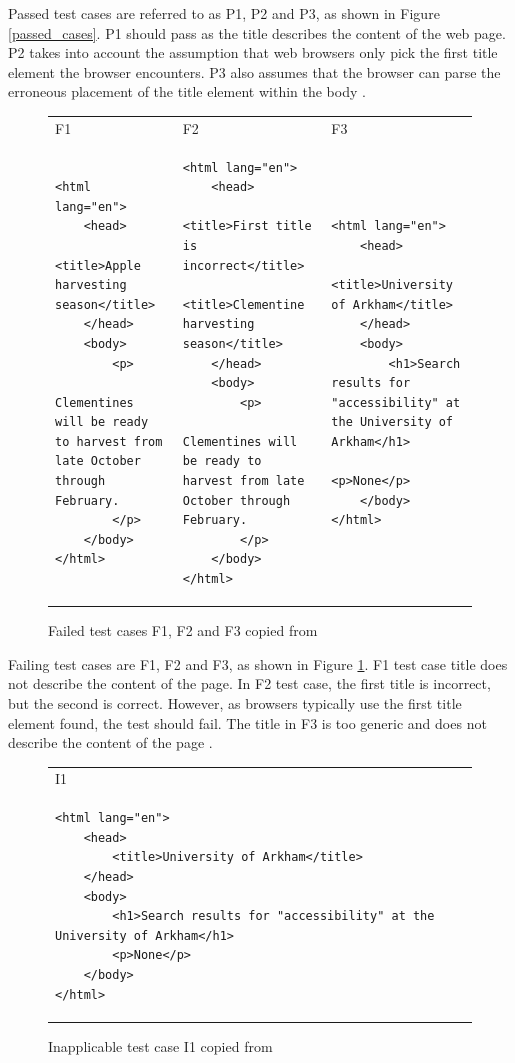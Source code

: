 Passed test cases are referred to as P1, P2 and P3, as shown in Figure \ref{passed_cases}. P1 should pass as the title describes the content of the web page. P2 takes into account the assumption that web browsers only pick the first title element the browser encounters. P3 also assumes that the browser can parse the erroneous placement of the title element within the body \citep{act_rule_g88}.


\begin{figure}[htbp]
\caption{Failed test cases F1, F2 and F3 copied from \textcite{act_rule_g88}}
\label{failing_cases}
\begin{tabular}{|p{4.9cm}|p{4.9cm}|p{4.9cm}|}
F1 & F2 & F3 \\
\begin{lstlisting}
<html lang="en">
	<head>
		<title>Apple harvesting season</title>
	</head>
	<body>
		<p>
			Clementines will be ready to harvest from late October through February.
		</p>
	</body>
</html>
\end{lstlisting}&
\begin{lstlisting}
<html lang="en">
	<head>
		<title>First title is incorrect</title>
		<title>Clementine harvesting season</title>
	</head>
	<body>
		<p>
			Clementines will be ready to harvest from late October through February.
		</p>
	</body>
</html>
\end{lstlisting}&
\begin{lstlisting}
<html lang="en">
	<head>
		<title>University of Arkham</title>
	</head>
	<body>
		<h1>Search results for "accessibility" at the University of Arkham</h1>
		<p>None</p>
	</body>
</html>
\end{lstlisting}
\end{tabular}
\end{figure}

Failing test cases are F1, F2 and F3, as shown in Figure \ref{failing_cases}. F1 test case title does not describe the content of the page. In F2 test case, the first title is incorrect, but the second is correct. However, as browsers typically use the first title element found, the test should fail. The title in F3 is too generic and does not describe the content of the page \citep{act_rule_g88}.

\begin{figure}
\caption{Inapplicable test case I1 copied from \textcite{act_rule_g88}}
\label{inapplicable_case}
\begin{tabular}{|p{4.9cm}|}
 I1 \\
 \begin{lstlisting}
<html lang="en">
	<head>
		<title>University of Arkham</title>
	</head>
	<body>
		<h1>Search results for "accessibility" at the University of Arkham</h1>
		<p>None</p>
	</body>
</html>
\end{lstlisting}
\end{tabular}
\end{figure}

